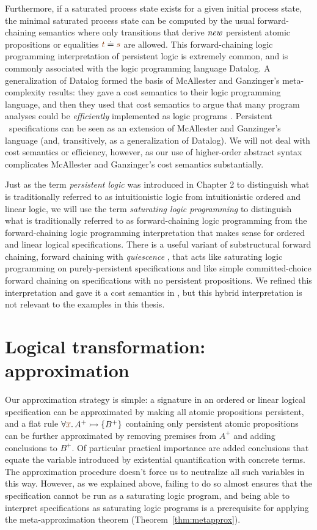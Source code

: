 Furthermore, if a saturated process state exists for a given initial
process state, the minimal saturated process state can be computed by
the usual forward-chaining semantics where only transitions that
derive ${\it new}$ persistent atomic propositions or equalities
$\lf{t} \doteq \lf{s}$ are allowed. This forward-chaining logic
programming interpretation of persistent logic is extremely common,
and is commonly associated with the logic programming language
Datalog.  A generalization of Datalog formed the basis of McAllester
and Ganzinger's meta-complexity results: they gave a cost semantics to
their logic programming language, and then they used that cost
semantics to argue that many program analyses could be {\it
  efficiently} implemented as logic programs
\cite{mcallester02complexity,ganzinger02logical}. Persistent
\sls~specifications can be seen as an extension of McAllester and
Ganzinger's language (and, transitively, as a generalization of
Datalog). We will not deal with cost semantics or efficiency, however,
as our use of higher-order abstract syntax complicates McAllester and
Ganzinger's cost semantics substantially.

Just as the term {\it persistent logic} was introduced in Chapter 2 to
distinguish what is traditionally referred to as intuitionistic logic
from intuitionistic ordered and linear logic, we will use the term
{\it saturating logic programming} to distinguish what is
traditionally referred to as forward-chaining logic programming from
the forward-chaining logic programming interpretation that makes sense
for ordered and linear logical specifications. There is a useful
variant of substructural forward chaining, forward chaining with {\it
  quiescence} \cite{lopez05monadic}, that acts like saturating logic
programming on purely-persistent specifications and like simple
committed-choice forward chaining on specifications with no persistent
propositions. We refined this interpretation and gave it a cost
semantics in \cite{simmons08linear}, but this hybrid interpretation is
not relevant to the examples in this thesis.

\section{Logical transformation: approximation}
\label{sec:abstraction}

Our approximation strategy is simple: a signature in an ordered or
linear logical specification can be approximated by making all atomic
propositions persistent, and a flat rule $\forall
\lf{\overline{x}}. \,A^+ \lefti \{ B^+ \}$ containing only persistent
atomic propositions can be further approximated by removing premises
from $A^+$ and adding conclusions to $B^+$. Of particular practical
importance are added conclusions that equate the variable introduced
by existential quantification with concrete terms. The approximation
procedure doesn't force us to neutralize all such variables in this
way. However, as we explained above, failing to do so almost ensures
that the specification cannot be run as a saturating logic program,
and being able to interpret specifications as saturating logic
programs is a prerequisite for applying the meta-approximation theorem
(Theorem~\ref{thm:metapprox}).

